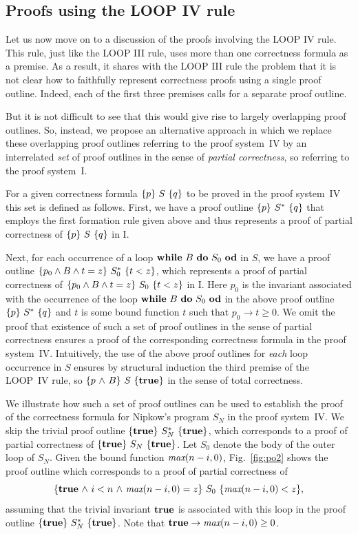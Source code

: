 \documentclass[runningheads]{llncs}       %
\begin{document}
\subsection{Proofs using the LOOP IV rule}

Let us now move on to a discussion of the proofs involving the LOOP IV
rule.  This rule, just like the LOOP III rule, uses more than one
correctness formula as a premise. As a result, it shares with the LOOP
III rule the problem that it is not clear how to faithfully represent
correctness proofs using a single proof outline.
Indeed, each of the first three premises calls for a separate proof
outline.

But it is not difficult to see that this would give rise to largely
overlapping proof outlines.  So, instead, we propose an alternative
approach in which we replace these overlapping proof outlines
referring to the proof system~IV by an interrelated \emph{set} of
proof outlines in the sense of \emph{partial correctness}, so
referring to the proof system~I.

For a given correctness formula $\mbox{$\{{p}\}\ {S}\ \{{q}\}$}$ to be proved in the
proof system~IV this set is defined as follows.  First, we have a
proof outline $\mbox{$\{{p}\}\ {S^*}\ \{{q}\}$}$ that employs the first formation rule
given above and thus represents a proof of partial correctness of
$\mbox{$\{{p}\}\ {S}\ \{{q}\}$}$ in I.

Next, for each occurrence of a loop $\mbox{$\mbox{{\bf while}\ } {B}\ \mbox{{\bf do}\ } {S_0}\ \mbox{{\bf od}}$}$ in $S$, we have a
proof outline $\mbox{$\{{p_0\wedge B \wedge t=z}\}\ {S^*_0}\ \{{t<z}\}$}$, which
represents a proof of partial correctness of
$\mbox{$\{{p_0\wedge B \wedge t=z}\}\ {S_0}\ \{{t<z}\}$}$ in I. Here $p_0$ is the
invariant associated with the occurrence of the loop $\mbox{$\mbox{{\bf while}\ } {B}\ \mbox{{\bf do}\ } {S_0}\ \mbox{{\bf od}}$}$ in
the above proof outline $\mbox{$\{{p}\}\ {S^*}\ \{{q}\}$}$ and $t$ is some bound
function $t$ such that $p_0\to t\geq 0$.  We omit the proof that
existence of such a set of proof outlines in the sense of partial
correctness ensures a proof of the corresponding correctness formula
in the proof system~IV.  Intuitively, the use of the above proof
outlines for \emph{each} loop occurrence in $S$ ensures by structural
induction the third premise of the LOOP~IV rule, so
$\mbox{$\{{p \mbox{$\ \wedge\ $} B}\}\ {S}\ \{{\mathbf{true}}\}$}$ in the sense of total correctness.

We illustrate how such a set of proof outlines can be used to
establish the proof of the correctness formula  
for Nipkow's program $S_N$ in
the proof system~IV.  We skip the trivial proof outline
$\mbox{$\{{\mbox{{\bf true}}}\}\ {S^*_N}\ \{{\mbox{{\bf true}}}\}$}$, which corresponds to a proof of partial
correctness of $\mbox{$\{{\mbox{{\bf true}}}\}\ {S_N}\ \{{\mbox{{\bf true}}}\}$}$.  Let $S_0$ denote the body of the
outer loop of $S_N$.  Given the bound function
$\mbox{\it max}(n-i,0)$, Fig.~\ref{fig:po2} shows the proof outline
which corresponds to a proof of  partial correctness of
$$\mbox{$\{{\mbox{{\bf true}}\mbox{$\ \wedge\ $} i < n \mbox{$\ \wedge\ $} \mbox{\it max}(n-i,0) = z}\}\ {S_0}\ \{{\mbox{\it max}(n-i,0) < z}\}$},$$
assuming that the trivial invariant $\mbox{{\bf true}}$ is associated with this loop
in the proof outline $\mbox{$\{{\mbox{{\bf true}}}\}\ {S^*_N}\ \{{\mbox{{\bf true}}}\}$}$.  Note that
$\mbox{{\bf true}}\to \mbox{\it max}(n-i,0)\geq 0$.
 
\end{document}

